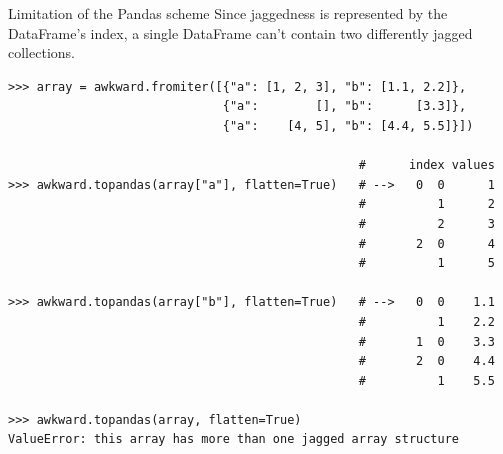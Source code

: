 \documentclass[aspectratio=169]{beamer}
\begin{document}
\begin{frame}[fragile]{Limitation of the Pandas scheme}
\large
\vspace{0.25 cm}
Since jaggedness is represented by the DataFrame's index, a single DataFrame can't contain two differently jagged collections.

\scriptsize
\vspace{0.15 cm}
\begin{verbatim}
>>> array = awkward.fromiter([{"a": [1, 2, 3], "b": [1.1, 2.2]},
                              {"a":        [], "b":      [3.3]},
                              {"a":    [4, 5], "b": [4.4, 5.5]}])

                                                 #      index values
>>> awkward.topandas(array["a"], flatten=True)   # -->   0  0      1
                                                 #          1      2
                                                 #          2      3
                                                 #       2  0      4
                                                 #          1      5

>>> awkward.topandas(array["b"], flatten=True)   # -->   0  0    1.1
                                                 #          1    2.2
                                                 #       1  0    3.3
                                                 #       2  0    4.4
                                                 #          1    5.5

>>> awkward.topandas(array, flatten=True)
ValueError: this array has more than one jagged array structure
\end{verbatim}
\end{frame}
\end{document}
